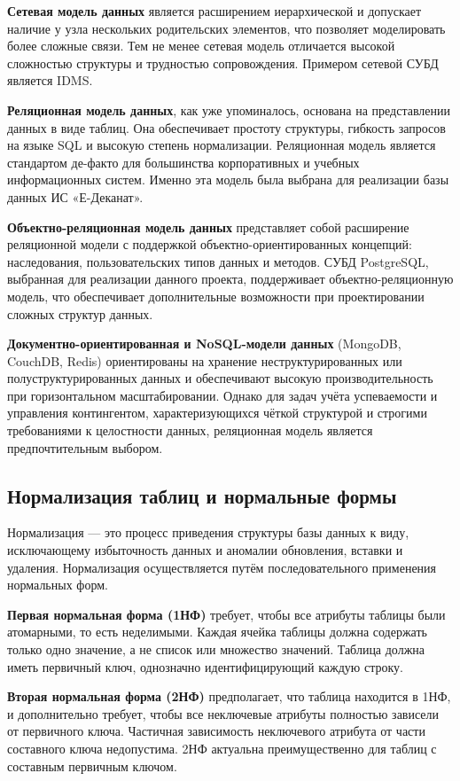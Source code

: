 \documentclass[14pt, a4paper]{extreport}
\begin{document}
\textbf{Сетевая модель данных} является расширением иерархической и допускает наличие у узла нескольких родительских элементов, что позволяет моделировать более сложные связи. Тем не менее сетевая модель отличается высокой сложностью структуры и трудностью сопровождения. Примером сетевой СУБД является IDMS.

\textbf{Реляционная модель данных}, как уже упоминалось, основана на представлении данных в виде таблиц. Она обеспечивает простоту структуры, гибкость запросов на языке SQL и высокую степень нормализации. Реляционная модель является стандартом де-факто для большинства корпоративных и учебных информационных систем. Именно эта модель была выбрана для реализации базы данных ИС «Е-Деканат».

\textbf{Объектно-реляционная модель данных} представляет собой расширение реляционной модели с поддержкой объектно-ориентированных концепций: наследования, пользовательских типов данных и методов. СУБД PostgreSQL, выбранная для реализации данного проекта, поддерживает объектно-реляционную модель, что обеспечивает дополнительные возможности при проектировании сложных структур данных.

\textbf{Документно-ориентированная и NoSQL-модели данных} (MongoDB, CouchDB, Redis) ориентированы на хранение неструктурированных или полуструктурированных данных и обеспечивают высокую производительность при горизонтальном масштабировании. Однако для задач учёта успеваемости и управления контингентом, характеризующихся чёткой структурой и строгими требованиями к целостности данных, реляционная модель является предпочтительным выбором.

\subsection{Нормализация таблиц и нормальные формы}
Нормализация --- это процесс приведения структуры базы данных к виду, исключающему избыточность данных и аномалии обновления, вставки и удаления. Нормализация осуществляется путём последовательного применения нормальных форм.

\textbf{Первая нормальная форма (1НФ)} требует, чтобы все атрибуты таблицы были атомарными, то есть неделимыми. Каждая ячейка таблицы должна содержать только одно значение, а не список или множество значений. Таблица должна иметь первичный ключ, однозначно идентифицирующий каждую строку.

\textbf{Вторая нормальная форма (2НФ)} предполагает, что таблица находится в 1НФ, и дополнительно требует, чтобы все неключевые атрибуты полностью зависели от первичного ключа. Частичная зависимость неключевого атрибута от части составного ключа недопустима. 2НФ актуальна преимущественно для таблиц с составным первичным ключом.
\end{document}
